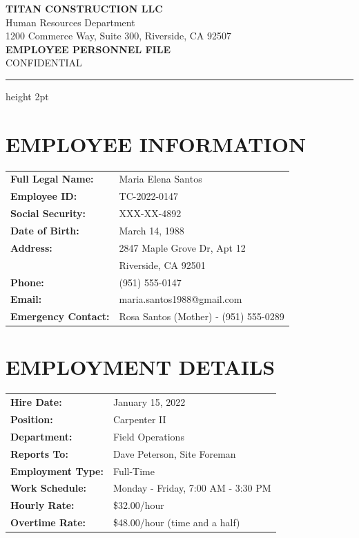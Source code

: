 \documentclass[11pt]{article}
\begin{document}
\begin{center}
{\Large\bfseries\color{titanblue} TITAN CONSTRUCTION LLC}\\[0.3em]
{\small Human Resources Department}\\
{\small 1200 Commerce Way, Suite 300, Riverside, CA 92507}\\[1em]
{\LARGE\bfseries EMPLOYEE PERSONNEL FILE}\\
{\large CONFIDENTIAL}
\end{center}

\vspace{0.5em}
\hrule height 2pt
\vspace{1em}

\section*{EMPLOYEE INFORMATION}

\begin{tabular}{@{}p{4cm}p{10cm}@{}}
\textbf{Full Legal Name:} & Maria Elena Santos \\
\textbf{Employee ID:} & TC-2022-0147 \\
\textbf{Social Security:} & XXX-XX-4892 \\
\textbf{Date of Birth:} & March 14, 1988 \\
\textbf{Address:} & 2847 Maple Grove Dr, Apt 12 \\
& Riverside, CA 92501 \\
\textbf{Phone:} & (951) 555-0147 \\
\textbf{Email:} & maria.santos1988@gmail.com \\
\textbf{Emergency Contact:} & Rosa Santos (Mother) - (951) 555-0289 \\
\end{tabular}

\section*{EMPLOYMENT DETAILS}

\begin{tabular}{@{}p{4cm}p{10cm}@{}}
\textbf{Hire Date:} & January 15, 2022 \\
\textbf{Position:} & Carpenter II \\
\textbf{Department:} & Field Operations \\
\textbf{Reports To:} & Dave Peterson, Site Foreman \\
\textbf{Employment Type:} & Full-Time \\
\textbf{Work Schedule:} & Monday - Friday, 7:00 AM - 3:30 PM \\
\textbf{Hourly Rate:} & \$32.00/hour \\
\textbf{Overtime Rate:} & \$48.00/hour (time and a half) \\
\end{tabular}
\end{document}
